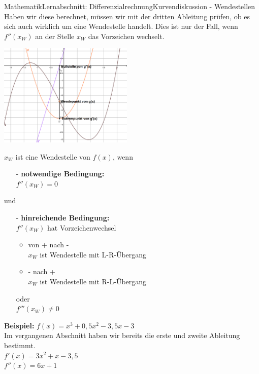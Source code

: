 \documentclass[11pt,twocolumn,oneside,openany,headings=optiontotoc,11pt,numbers=noenddot]{article}
\begin{document}
\begin{worksheet}{Mathematik}{Lernabschnitt: Differenzialrechnung}{Kurvendiskussion - Wendestellen}
		Haben wir diese berechnet, müssen wir mit der dritten Ableitung prüfen, ob es sich auch wirklich um eine Wendestelle handelt. Dies ist nur der Fall, wenn \(f''(x_W)\) an der Stelle \(x_W\) das Vorzeichen wechselt.\\
		\par\noindent
		\includegraphics[width=0.48\textwidth]{../99_Bilder/045_WS_VZW.png}
		\begin{framed}
			\(x_W\) ist eine Wendestelle von \(f(x)\), wenn
			\begin{itemize}
				\item[-] \textbf{notwendige Bedingung:}\\
				\(f''(x_W) = 0\)
			\end{itemize}
			und
			\begin{itemize}
				\item[-] \textbf{hinreichende Bedingung:}\\
				\(f''(x_W)\) hat Vorzeichenwechsel
				\begin{itemize}
					\item von \glqq{}+\grqq{} nach \glqq{}-\grqq{}\\
					\(x_W\) ist Wendestelle mit L-R-Übergang
					\item \glqq{}-\grqq{} nach \glqq{}+\grqq{}\\
					\(x_W\) ist Wendestelle mit R-L-Übergang
				\end{itemize}
				oder\\
				\(f'''(x_W)\neq 0\)\\
			\end{itemize}
		\end{framed}
		\newpage
		\noindent
		\textbf{Beispiel:} \(f(x) = x^3 + 0,5x^2 -3,5x -3\)\\
		Im vergangenen Abschnitt haben wir bereits die erste und zweite Ableitung bestimmt.\\
		\(f'(x) = 3x^2 + x -3,5\)\\
		\(f''(x) = 6x + 1\)\\
		\par\noindent

\end{worksheet}
\end{document}
